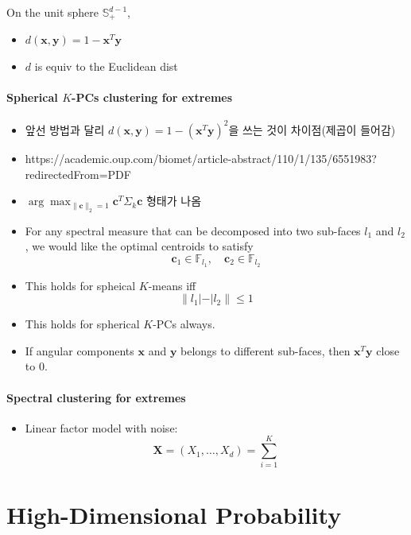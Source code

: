\documentclass[
  13pt,
  letterpaper,
  DIV=11,
  numbers=noendperiod]{scrreprt}
\providecommand{\tightlist}{%
  \setlength{\itemsep}{0pt}\setlength{\parskip}{0pt}}\usepackage{longtable,booktabs,array}
\theoremstyle{definition}
\theoremstyle{plain}
\theoremstyle{definition}
\theoremstyle{plain}
\theoremstyle{plain}
\theoremstyle{definition}
\theoremstyle{remark}
\begin{document}
On the unit sphere \(\mathbb{S}_{+}^{d-1}\),

\begin{itemize}
\tightlist
\item
  \(d(\pmb{x}, \pmb{y})= 1-\pmb{x}^T\pmb{y}\)
\item
  \(d\) is equiv to the Euclidean dist
\end{itemize}

\subsection{\texorpdfstring{Spherical \(K\)-PCs clustering for
extremes}{Spherical K-PCs clustering for extremes}}\label{spherical-k-pcs-clustering-for-extremes}

\begin{itemize}
\item
  앞선 방법과 달리 \(d(\pmb{x}, \pmb{y}) = 1-(\pmb{x}^T\pmb{y})^2\)을
  쓰는 것이 차이점(제곱이 들어감)
\item
  https://academic.oup.com/biomet/article-abstract/110/1/135/6551983?redirectedFrom=PDF
\item
  \(\arg\max_{\|\pmb{c}\|_2=1} \pmb{c}^T\Sigma_k \pmb{c}\) 형태가 나옴
\item
  For any spectral measure that can be decomposed into two sub-faces
  \(l_1\) and \(l_2\), we would like the optimal centroids to satisfy \[
  \pmb{c}_1 \in \mathbb{F}_{l_1}, \quad{} \pmb{c}_2 \in \mathbb{F}_{l_2}
  \]
\item
  This holds for spheical \(K\)-means iff \[
  \|l_1 | - | l_2 \| \leq 1
  \]
\item
  This holds for spherical \(K\)-PCs always.
\item
  If angular components \(\pmb{x}\) and \(\pmb{y}\) belongs to different
  sub-faces, then \(\pmb{x}^T\pmb{y}\) close to \(0\).
\end{itemize}

\subsection{Spectral clustering for
extremes}\label{spectral-clustering-for-extremes}

\begin{itemize}
\tightlist
\item
  Linear factor model with noise: \[
  \pmb{X} = (X_1, \ldots, X_d) = \sum_{i=1}^K
  \]
\end{itemize}

\part{High-Dimensional Probability}
\end{document}

